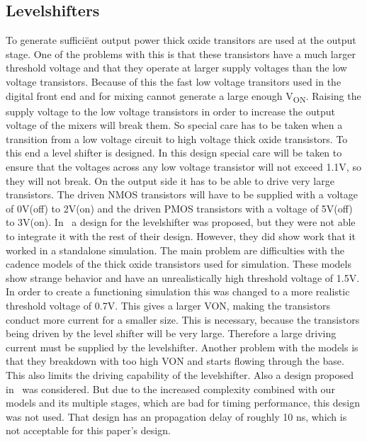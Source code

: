 \makeatletter
\newcommand*{\textoverline}[1]{$\overline{\hbox{#1}}\m@th$}
\makeatother

\subsection{Levelshifters}\label{sec:levelshifter}
To generate suffici\"{e}nt output power thick oxide transitors are used at the output stage. One of the problems with this is that these transistors have a much larger threshold voltage and that they operate at larger supply voltages than the low voltage transistors. Because of this the fast low voltage transitors used in the digital front end and for mixing cannot generate a large enough V\textsubscript{ON}. Raising the supply voltage to the low voltage transistors in order to increase the output voltage of the mixers will break them. So special care has to be taken when a transition from a low voltage circuit to high voltage thick oxide transistors. To this end a level shifter is designed. In this design special care will be taken to ensure that the voltages across any low voltage transistor will not exceed 1.1V, so they will not break. On the output side it has to be able to drive very large transistors. The driven NMOS transistors will have to be supplied with a voltage of 0V(off) to 2V(on) and the driven PMOS transistors with a voltage of 5V(off) to 3V(on). 
In~\cite{powerdac} a design for the levelshifter was proposed, but they were not able to integrate it with the rest of their design. However, they did show work that it worked in a standalone simulation. The main problem are difficulties with the cadence models of the thick oxide transistors used for simulation. These models show strange behavior and have an unrealistically high threshold voltage of 1.5V. In order to create a functioning simulation this was changed to a more realistic threshold voltage of 0.7V. This gives a larger VON, making the transistors conduct more current for a smaller size. This is necessary, because the transistors being driven by the level shifter will be very large. Therefore a large driving current must be supplied by the levelshifter. Another problem with the models is that they breakdown with too high VON and starts flowing through the base. This also limits the driving capability of the levelshifter. Also a design proposed in~\cite{hass2000level} was considered. But due to the increased complexity combined with our models and its multiple stages, which are bad for timing performance, this design was not used. That design has an propagation delay of roughly 10 ns, which is not acceptable for this paper's design. 
